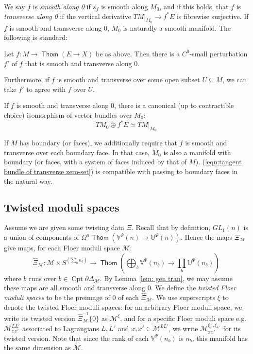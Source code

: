 \documentclass{TPmod}
\newcommand{\Cptd}{\operatorname{Cpt}\partial}
\def\bU{\mathbb{U}}
\def\bV{\mathbb{V}}
\DeclareMathOperator{\Thom}{\mathsf{Thom}}
\newcommand{\cM}{\mathcal{M}}
\renewcommand{\cong}{\simeq}
\numberwithin{equation}{section}
\begin{document}
    We say $f$ is \emph{smooth along 0} if $s_f$ is smooth along $M_0$, and if this holds, that $f$ is \emph{transverse along 0} if the vertical derivative $TM|_{M_0} \to f^*E$ is fibrewise surjective. If $f$ is smooth and transverse along 0, $M_0$ is naturally a smooth manifold. The following is standard:
    
    \begin{lem}\label{lem: gen tran}
        Let $f: M \to \Thom(E \to X)$ be as above. Then there is a $C^0$-small perturbation $f'$ of $f$ that is smooth and transverse along 0.

        Furthermore, if $f$ is smooth and transverse over some open subset $U \subseteq M$, we can take $f'$ to agree with $f$ over $U$.

        If $f$ is smooth and transverse along 0, there is a canonical (up to contractible choice) isomorphism of vector bundles over $M_0$:
        \begin{equation}\label{eqn:tangent bundle of transverse zero-set}
            TM_0 \oplus f^*E \cong TM|_{M_0}
        \end{equation}
    \end{lem}   
    If $M$ has boundary (or faces), we additionally require that $f$ is smooth and transverse over each boundary face. In that case, $M_0$ is also a manifold with boundary (or faces, with a system of faces induced by that of $M$). (\ref{eqn:tangent bundle of transverse zero-set}) is compatible with passing to boundary faces in the natural way.



\subsection{Twisted moduli spaces}\label{sec:twisted moduli}
    Assume we are given some twisting data $\Xi$. Recall that by definition, $GL_1(n)$ is a union of components of $\Omega^n \Thom(\bV^\Psi(n) \to \bU^\Psi(n))$. Hence the maps $\Xi_\cM$ give maps, for each Floer moduli space $\cM$:
    \begin{equation}\label{eqn:map defining twisted moduli}
        \hat\Xi_\cM: \cM \times S^{(\sum_b n_b)} \to  \Thom\left(\bigoplus_b\bV^\Psi(n_b) \to \prod_b\bU^\Psi(n_b)\right)
    \end{equation}
    where $b$ runs over $b \in \Cptd\Delta_\cM$.
    By Lemma \ref{lem: gen tran}, we may assume these maps are all smooth and transverse along 0. We define the \emph{twisted Floer moduli spaces} to be the preimage of 0 of each $\hat \Xi_\cM$. We use superscripts $\xi$ to denote the twisted Floer moduli spaces: for an arbitrary Floer moduli space, we write its twisted version $\hat\Xi_\cM^{-1}\{0\}$ as $\cM^\xi$, and for a specific Floer moduli space e.g. $\cM^{LL'}_{xx'}$ associated to Lagrangians $L, L'$ and $x, x' \in \cM^{LL'}$, we write $\cM^{\xi_L, \xi_{L'}}_{xx'}$ for its twisted version. Note that since the rank of each $\bV^\Psi(n_b)$ is $n_b$, this manifold has the same dimension as $\cM$.
\end{document}
